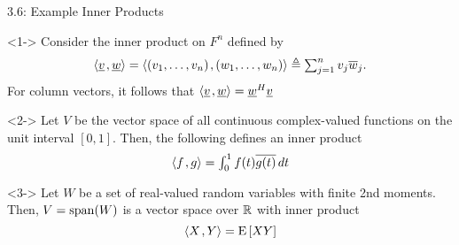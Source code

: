 \documentclass[10pt,english,aspectratio=169]{beamer}
\begin{document}
\begin{frame}{3.6: Example Inner Products}

\vspace{-2mm}

\begin{example}<1->
Consider the inner product on $F^n$ defined by \vspace{-1.5mm}
\begin{equation*}
\inner{ \vecnot{v} }{ \vecnot{w} }
= \inner{ (v_1, \ldots, v_n) }{ (w_1, \ldots, w_n) }
\triangleq \textstyle\sum_{j=1}^n v_j \overline{w}_j. \vspace{-1.5mm}
\end{equation*}
For column vectors, it follows that $ {\left\langle  \underline{v}  \mskip2mu ,  \underline{w}  \right\rangle} = \underline{w}^H \underline{v} $
\end{example}

\begin{example}<2->
Let $V$ be the vector space of all continuous complex-valued functions on the unit interval $[0,1]$.
Then, the following defines an inner product \vspace{-1.5mm}
\begin{equation*}
{\left\langle  f  \mskip2mu ,  g  \right\rangle}
= \textstyle\int_0^1 f(t) \overline{g(t)} \, dt
\end{equation*}
\end{example}

\begin{example}<3->
Let $W$ be a set of real-valued random variables with finite 2nd moments.
Then, $V = \mathrm{span} (W)$ is a vector space over $\mathbb{R}$ with inner product \vspace{-1.5mm}
\[ {\left\langle  X  \mskip2mu ,  Y  \right\rangle} = \mathrm{E} \left[ XY \right] \]
\end{example}


\end{frame}
\end{document}
